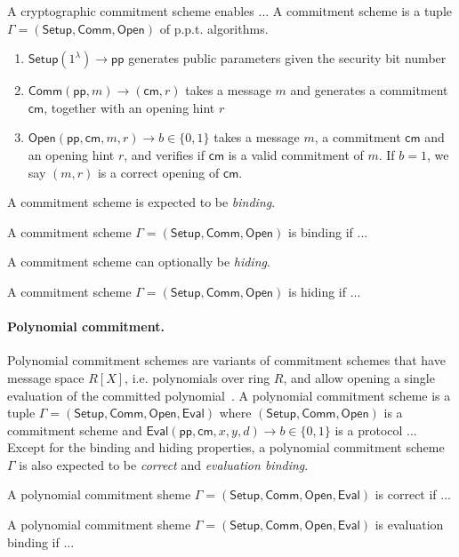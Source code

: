 \documentclass[acmtog]{acmart}
\newcommand{\Setup}{\mathsf{Setup}}
\newcommand{\Comm}{\mathsf{Comm}}
\newcommand{\Open}{\mathsf{Open}}
\newcommand{\Eval}{\mathsf{Eval}}
\newcommand{\pp}{\mathsf{pp}}
\newcommand{\cm}{\mathsf{cm}}
\begin{document}
A cryptographic commitment scheme enables ...
A commitment scheme is a tuple $\Gamma=(\Setup, \Comm, \Open)$ of p.p.t. algorithms.
\begin{enumerate}
	\item $\Setup(1^{\lambda})\to\pp$ generates public parameters given the security bit number
	\item $\Comm(\pp,m)\to(\cm,r)$ takes a message $m$ and generates a commitment $\cm$, together with an opening hint $r$
	\item $\Open(\pp,\cm,m,r)\to b\in\{0,1\}$ takes a message $m$, a commitment $\cm$ and an opening hint $r$, and verifies if $\cm$ is a valid commitment of $m$.
	If $b=1$, we say $(m,r)$ is a correct opening of $\cm$.
\end{enumerate}
A commitment scheme is expected to be \emph{binding}.

\begin{definition}[Binding]
A commitment scheme $\Gamma=(\Setup,\Comm,\Open)$ is binding if ...
\end{definition}

A commitment scheme can optionally be \emph{hiding}.

\begin{definition}[Hiding]
A commitment scheme $\Gamma=(\Setup,\Comm,\Open)$ is hiding if ...
\end{definition}

\paragraph{Polynomial commitment.} Polynomial commitment schemes are variants of commitment schemes that have message space $R[X]$, i.e. polynomials over ring $R$, and allow opening a single evaluation of the committed polynomial~\cite{KateZG10}.
A polynomial commitment scheme is a tuple $\Gamma=(\Setup,\Comm,\Open,\Eval)$ where $(\Setup,\Comm,\Open)$ is a commitment scheme and $\Eval(\pp,\cm,x,y,d)\to b\in\{0,1\}$ is a protocol ...
Except for the binding and hiding properties, a polynomial commitment scheme $\Gamma$ is also expected to be \emph{correct} and \emph{evaluation binding}.

\begin{definition}[Correct]
A polynomial commitment sheme $\Gamma=(\Setup,\Comm,\Open,\Eval)$ is correct if ...
\end{definition}

\begin{definition}
A polynomial commitment sheme $\Gamma=(\Setup,\Comm,\Open,\Eval)$ is evaluation binding if ...
\end{definition}
\end{document}

